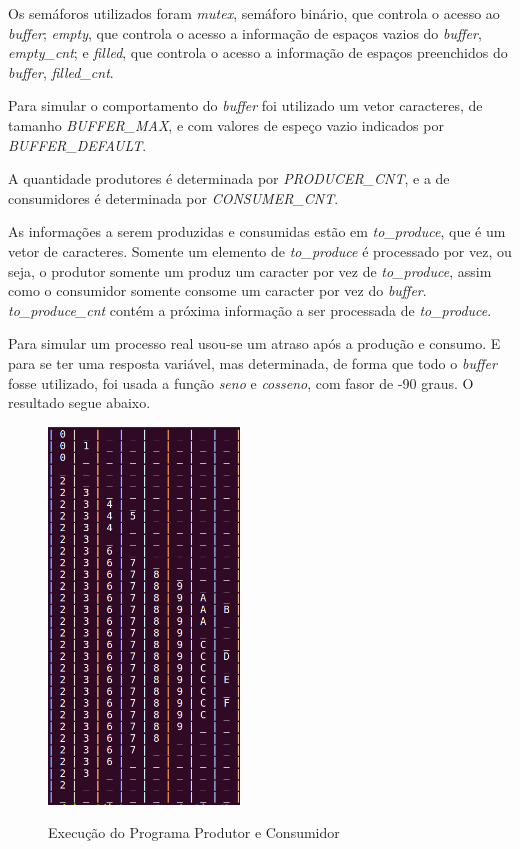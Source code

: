 \documentclass[a4paper, 11pt]{article}
\begin{document}
Os semáforos utilizados foram \textit{mutex}, semáforo binário, que controla o acesso ao \textit{buffer}; \textit{empty}, que controla o acesso a informação de espaços vazios do \textit{buffer}, \textit{empty\_cnt}; e \textit{filled}, que controla o acesso a informação de espaços preenchidos do \textit{buffer}, \textit{filled\_cnt}.

Para simular o comportamento do \textit{buffer} foi utilizado um vetor caracteres, de tamanho \textit{BUFFER\_MAX}, e com valores de espeço vazio indicados por \textit{BUFFER\_DEFAULT}.

A quantidade produtores é determinada por \textit{PRODUCER\_CNT}, e a de consumidores é determinada por \textit{CONSUMER\_CNT}.

As informações a serem produzidas e consumidas estão em \textit{to\_produce}, que é um vetor de caracteres. Somente um elemento de \textit{to\_produce} é processado por vez, ou seja, o produtor somente um produz um caracter por vez de \textit{to\_produce}, assim como o consumidor somente consome um caracter por vez do \textit{buffer}. \textit{to\_produce\_cnt} contém a próxima informação a ser processada de \textit{to\_produce}.

Para simular um processo real usou-se um atraso após a produção e consumo. E para se ter uma resposta variável, mas determinada, de forma que todo o \textit{buffer} fosse utilizado, foi usada a função \textit{seno} e \textit{cosseno}, com fasor de -90 graus. O resultado segue abaixo.

\begin{figure}[!h]
\caption{Execução do Programa Produtor e Consumidor}
\includegraphics[height=10cm]{produtor_consumidor}
\centering
\label{fig1}
\end{figure}
\end{document}
